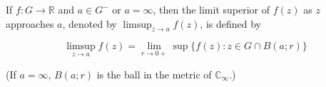 If $f: G \to \mathbb{R}$ and $a \in G^{-}$ or $a = \infty$, then the limit superior of $f(z)$ as $z$ approaches $a$, denoted by $\limsup_{z \to a} f(z)$, is defined by

$$\limsup_{z \to a} f(z) = \lim_{r \to 0+} \sup \{ f(z): z \in G \cap B(a; r) \}$$

(If $a = \infty$, $B(a; r)$ is the ball in the metric of $\mathbb{C}_{\infty}$.)
